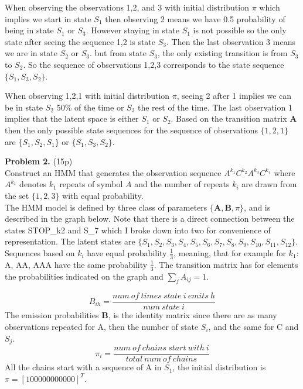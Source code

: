 \documentclass[12pt]{article}
\newcommand{\matr}[1]{\bm{#1}}
\begin{document}
When observing the observations 1,2, and 3 with initial distribution $\pi$ which implies we start in state $S_1$ then observing 2 means we have 0.5 probability of being in state $S_1$ or $S_3$.
However staying in state $S_1$ is not possible so the only state after seeing the sequence 1,2 is state $S_3$. Then the last observation 3 means we are in state $S_2$ or $S_3$. but from state $S_3$, 
the only existing transition is from $S_3$ to $S_2$. So the sequence of observations 1,2,3 corresponds to the state sequence $\{S_1, S_3, S_2 \}$.

When observing 1,2,1 with initial distribution $\pi$, seeing 2 after 1 implies we can be in state $S_2$ 50\% of the time or $S_3$ the rest of the time. The last observation 1 implies that the latent space is either $S_1$ or $S_2$.
Based on the transition matrix $\matr{A}$ then the only possible state sequences for the sequence of observations $\{1,2,1\}$ are $\{S_1, S_2, S_1\}$ or  $\{S_1, S_3, S_2\}$.

\noindent \textbf{Problem 2.} (15p)\\
Construct an HMM that generates the observation sequence $A^{k_1}C^{k_2}A^{k_3}C^{k_4}$ where $A^{k_1}$ denotes $k_1$ repeats of symbol $A$ and the number of repeats $k_i$ are drawn from the set $\{1,2,3\}$ with equal probability.\\

The HMM model is defined by three class of parameters $\{\matr{A}, \matr{B}, \pi \}$, and is described in the graph below. Note that there is a direct connection between the states STOP\_k2 and S\_7 which I broke down into two for convenience of
representation.
The latent states are $\{S_1, S_2, S_3, S_4, S_5, S_6, S_7, S_8, S_9, S_{10}, S_{11}, S_{12}\}$. Sequences based on $k_i$ have equal probability $\frac{1}{3}$, meaning, that for example for $k_1$: A, AA, AAA have the same probability $\frac{1}{3}$.
The transition matrix has for elements the probabilities indicated on the graph and $\sum_{j} A_{ij}=1$.

$$B_{ih}=\frac{num\ of\ times\ state\ i\ emits\ h}{num\ state\ i}$$
The emission probabilities $\matr{B}$, is the identity matrix since there are as many observations repeated for A,
then the number of state $S_i$, and the same for C and $S_j$.
$$\pi_{i}=\frac{num\ of\ chains\ start\ with\ i}{total\ num\ of\ chains}$$
All the chains start with a sequence of A in $S_1$, the initial distribution is $\pi = [1 0 0 0 0 0 0 0 0 0 0 0]^T$.
\end{document}
